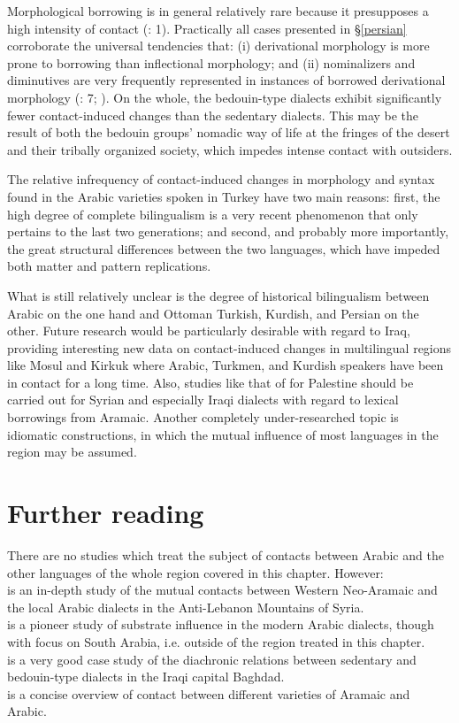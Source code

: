 \documentclass[output=paper]{langsci/langscibook}
\begin{document}
Morphological borrowing is in general relatively rare because it presupposes a high intensity of contact (\citealt{GardaniArkadievAmiridze2015}: 1). Practically all cases presented in §\ref{persian} corroborate the universal tendencies that: (i) derivational morphology is more prone to borrowing than inflectional morphology; and (ii) nominalizers and diminutives are very frequently represented in instances of borrowed derivational morphology (\citealt{GardaniArkadievAmiridze2015}: 7; \citealt{Seifart2013}). On the whole, the bedouin-type dialects exhibit significantly fewer contact-induced changes than the sedentary dialects. This may be the result of both the bedouin groups' nomadic way of life at the fringes of the desert and their tribally organized society, which impedes intense contact with outsiders.

The relative infrequency of contact-induced changes in morphology and syntax found in the Arabic varieties spoken in Turkey have two main reasons: first, the high degree of complete bilingualism is a very recent phenomenon that only pertains to the last two generations; and second, and probably more importantly, the great structural differences between the two languages, which have impeded both matter and pattern replications.

What is still relatively unclear is the degree of historical bilingualism between Arabic on the one hand and Ottoman Turkish, Kurdish, and Persian on the other. Future research would be particularly desirable with regard to Iraq, providing interesting new data on contact-induced changes in multilingual regions like Mosul and Kirkuk where Arabic, Turkmen, and Kurdish speakers have been in contact for a long time. Also, studies like that of  \citet{Neishtadt2015} for Palestine should be carried out for Syrian and especially Iraqi dialects with regard to lexical borrowings from Aramaic. Another completely under-researched topic is idiomatic constructions, in which the mutual influence of most languages in the region may be assumed.

\section*{Further reading}

There are no studies which treat the subject of contacts between Arabic and the other languages of the whole region covered in this chapter. However:\\
\citet{ArnoldBehnstedt1993} is an in-depth study of the mutual contacts between Western Neo-Aramaic and the local Arabic dialects in the Anti-Lebanon Mountains of Syria.\\
\citet{Diem1979} is a pioneer study of substrate influence in the modern Arabic dialects, though with focus on South Arabia, i.e. outside of the region treated in this chapter.\\
\citet{Palva2009} is a very good case study of the diachronic relations between sedentary and bedouin-type dialects in the Iraqi capital Baghdad.\\
\citet{Weninger2011Aramaic} is a concise overview of contact between different varieties of Aramaic and Arabic.
\end{document}
